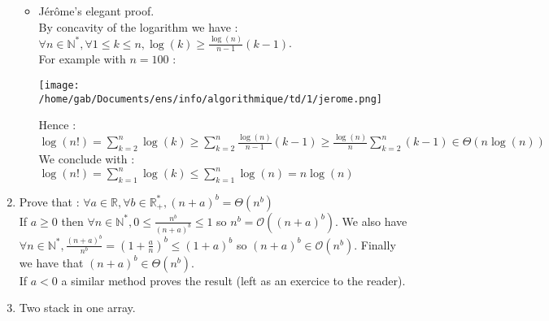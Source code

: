 \documentclass[12pt,4paper]{article}
\begin{document}
\begin{enumerate}
\begin{itemize}
\item Jérôme's elegant proof.\\
By concavity of the logarithm we have : $\forall n \in \mathbb{N}^*, \forall
1 \leq k \leq
n, \log(k) \geq \frac{\log(n)}{n-1}(k - 1)$.\\
For example with $n=100$ :\\

\begin{center}
\texttt{[image: /home/gab/Documents/ens/info/algorithmique/td/1/jerome.png]}
\end{center}

Hence : $\log(n!)=\sum_{k=2}^n\log(k)\geq \sum_{k=2}^n
\frac{\log(n)}{n-1}(k-1) \geq \frac{\log(n)}{n}\sum_{k=2}^n (k - 1) \in
\Theta(n\log(n))$\\
We conclude with : $\log(n!) = \sum_{k=1}^n \log(k) \leq \sum_{k=1}^n \log(n) = n \log(n)$

\end{itemize}

\item Prove that : $\forall a \in \mathbb{R}, \forall b \in \mathbb{R}^*_+,
(n + a)^b = \Theta(n^b)$\\
If $a \geq 0$ then
$\forall n \in \mathbb{N}^*, 0 \leq \frac{n^b}{(n + a)^b} \leq 1$ so $n^b = \mathcal{O}((n + a)^b)$. We
also have $\forall n \in \mathbb{N}^*, \frac{(n + a)^b}{n^b} = (1 +
\frac{a}{n})^b \leq (1 + a)^b$ so $(n + a)^b \in \mathcal{O}(n^b)$. Finally we
have that $(n + a)^b \in \Theta(n^b)$.\\
If $a < 0$ a similar method proves the result (left as an exercice to the
reader).\\

\item Two stack in one array.

\begin{algorithm}[H]
\DontPrintSemicolon


\;

\;

\;


\end{algorithm}
\end{enumerate}
\end{document}

